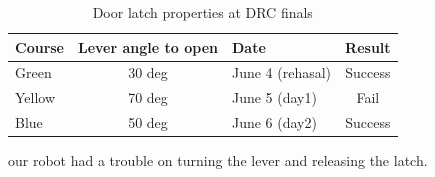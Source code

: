 %
\begin{table}[htb]
\caption{Door latch properties at DRC finals} \label{tbl:door_latch}
\begin{tabular}{lclc}
\hline
Course & Lever angle to open & Date & Result  \\ 
\hline
Green & 30 deg & June 4 (rehasal) & Success  \\
Yellow & 70 deg & June 5 (day1) & Fail \\
Blue &  50 deg & June 6 (day2)  & Success \\
\hline
\end{tabular}
\end{table}

our robot had a trouble on turning the lever and releasing the latch.

